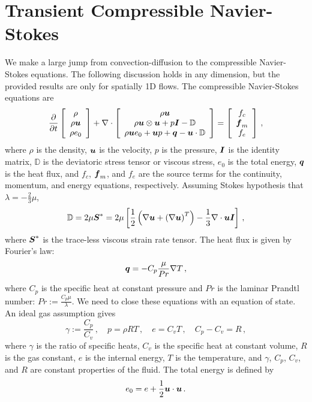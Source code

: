 \documentclass[Dissertation.tex]{subfiles}
\begin{document}
\section{Transient Compressible Navier-Stokes}
We make a large jump from convection-diffusion to the compressible Navier-Stokes equations.
The following discussion holds in any dimension, but the provided results are only for spatially 1D flows.
The compressible Navier-Stokes equations are
\begin{align}
\frac{\partial}{\partial t}\left[ \begin{array}{c} \rho\\ \rho\boldsymbol u\\ \rho e_0\\ \end{array} \right]
+\nabla\cdot\left[ \begin{array}{c} \rho\boldsymbol u\\ \rho\boldsymbol u\otimes\boldsymbol u+p\boldsymbol I-\mathbb{D}\\ \rho\boldsymbol u e_0+\boldsymbol u p+\boldsymbol q-\boldsymbol u\cdot\mathbb{D}\\ \end{array} \right]
=\left[ \begin{array}{c} f_c\\ \boldsymbol f_m\\ f_e\\ \end{array} \right]\,,
\end{align}
where $\rho$ is the density, $\boldsymbol u$ is the velocity, $p$ is the pressure, $\boldsymbol I$ is the identity matrix,
$\mathbb{D}$ is the deviatoric stress tensor or viscous stress, $e_0$ is the total energy, $\boldsymbol q$ is the heat flux, 
and $f_c$, $\boldsymbol f_m$, and $f_e$ are the source terms for the continuity, momentum, and energy equations, respectively.
Assuming Stokes hypothesis that $\lambda=-\frac{2}{3}\mu$, 
\begin{equation*}
	\mathbb{D}=2\mu\boldsymbol S^*=2\mu\left[ \frac{1}{2}\left( \nabla\boldsymbol u+\left( \nabla\boldsymbol u \right)^T \right)-\frac{1}{3}\nabla\cdot\boldsymbol u\boldsymbol I \right]\,,
\end{equation*}
where $\boldsymbol S^*$ is the trace-less viscous strain rate tensor.
The heat flux is given by Fourier's law:
\begin{equation*}
	\boldsymbol q=-C_p\frac{\mu}{Pr}\nabla T\,,
\end{equation*}
where $C_p$ is the specific heat at constant pressure and $Pr$ is the laminar Prandtl number: $Pr:=\frac{C_p\mu}{\lambda}$.
We need to close these equations with an equation of state. An ideal gas assumption gives
\begin{equation*}
	\gamma:=\frac{C_p}{C_v}\,,\quad p=\rho RT\,,\quad e=C_v T\,,\quad C_p-C_v=R\,,
\end{equation*}
where $\gamma$ is the ratio of specific heats, $C_v$ is the specific heat at constant volume, $R$ is the gas constant,
$e$ is the internal energy, $T$ is the temperature,
and $\gamma$, $C_p$, $C_v$, and $R$ are constant properties of the fluid.
The total energy is defined by
\begin{equation*}
	e_0=e+\frac{1}{2}\boldsymbol u\cdot\boldsymbol u\,.
\end{equation*}
\end{document}
